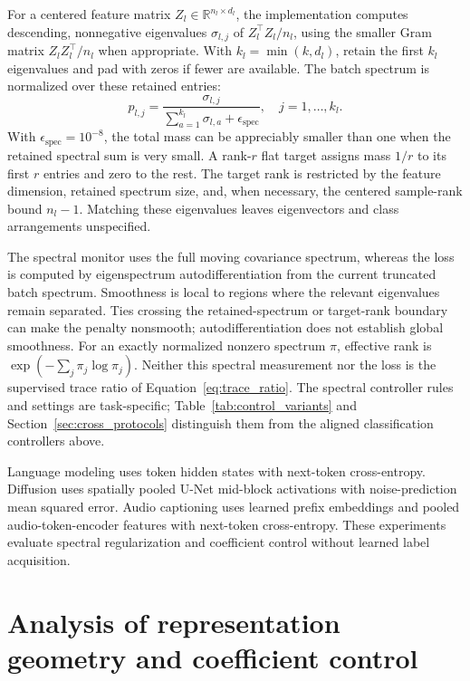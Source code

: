 \documentclass[10pt,a4paper,twocolumn]{article}
\newcommand{\R}{\mathbb{R}}
\newcommand{\epsp}{\epsilon_{\mathrm{spec}}}
\begin{document}
For a centered feature matrix $Z_l\in\R^{n_l\times d_l}$,
the implementation computes descending, nonnegative eigenvalues
$\sigma_{l,j}$ of $Z_l^\top Z_l/n_l$, using the smaller Gram matrix
$Z_lZ_l^\top/n_l$ when appropriate. With $k_l=\min(k,d_l)$, retain
the first $k_l$ eigenvalues and pad with zeros if fewer are available.
The batch spectrum is normalized over these retained entries:
\begin{equation}
 p_{l,j}=
 \frac{\sigma_{l,j}}
 {\sum_{a=1}^{k_l}\sigma_{l,a}+\epsp},
 \quad j=1,\ldots,k_l.
 \label{eq:spectrum_normalization}
\end{equation}
With $\epsp=10^{-8}$, the total mass can be appreciably smaller than
one when the retained spectral sum is very small. A rank-$r$
flat target assigns mass $1/r$ to its first $r$ entries and zero to the
rest. The target rank is restricted by the feature dimension, retained
spectrum size, and, when necessary, the centered sample-rank bound
$n_l-1$. Matching these eigenvalues leaves eigenvectors and class
arrangements unspecified.

The spectral monitor uses the full moving covariance spectrum, whereas
the loss is computed by eigenspectrum autodifferentiation from the current
truncated batch spectrum. Smoothness is local to regions where the
relevant eigenvalues remain separated. Ties crossing the retained-spectrum
or target-rank boundary can make the penalty nonsmooth; autodifferentiation
does not establish global smoothness.
For an exactly normalized nonzero spectrum $\pi$, effective rank is
$\exp(-\sum_j\pi_j\log\pi_j)$. Neither this spectral measurement nor
the loss is the supervised trace ratio of
Equation~\eqref{eq:trace_ratio}. The spectral controller rules and
settings are task-specific; Table~\ref{tab:control_variants} and
Section~\ref{sec:cross_protocols} distinguish them from the aligned
classification controllers above.

Language modeling uses token hidden states with next-token
cross-entropy. Diffusion uses spatially pooled U-Net mid-block
activations with noise-prediction mean squared error. Audio captioning
uses learned prefix embeddings and pooled audio-token-encoder features
with next-token cross-entropy. These experiments evaluate spectral
regularization and coefficient control without learned label acquisition.

\section{Analysis of representation geometry and coefficient control}
\label{sec:theory}
\end{document}
